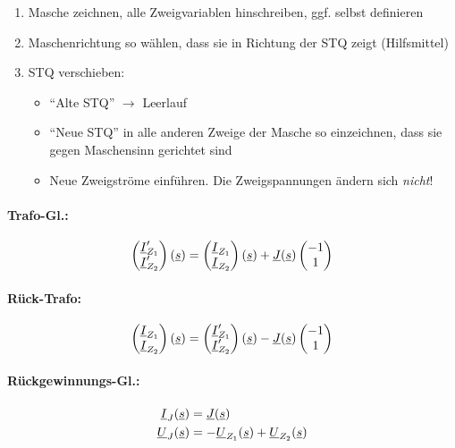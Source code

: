 \begin{minipage}{0.5\textwidth}
\begin{enumerate}[label=\arabic*.)]
  \item
    Masche zeichnen, alle Zweigvariablen hinschreiben, ggf. selbst definieren
  \item
    Maschenrichtung so wählen, dass sie in Richtung der STQ zeigt (Hilfsmittel)
  \item
    STQ verschieben:
    \begin{itemize}
      \item "`Alte STQ"' $\to$ Leerlauf
      \item "`Neue STQ"' in alle anderen Zweige der Masche so einzeichnen,
        dass sie gegen Maschensinn gerichtet sind
      \item Neue Zweigströme einführen.
        Die Zweigspannungen ändern sich \emph{nicht}!
    \end{itemize}
\end{enumerate}
\end{minipage}

\paragraph{Trafo-Gl.:}
\[\begin{pmatrix}
    \underline{I}_{Z_1}' \\
    \underline{I}_{Z_2}'
  \end{pmatrix}(\underline{s})
  = \begin{pmatrix}
      \underline{I}_{Z_1} \\
      \underline{I}_{Z_2}
    \end{pmatrix}(\underline{s})
    +\underline{J}(\underline{s})
    \begin{pmatrix}-1\\1\end{pmatrix}
\]

\paragraph{Rück-Trafo:}
\[\begin{pmatrix}
    \underline{I}_{Z_1} \\
    \underline{I}_{Z_2}
  \end{pmatrix}(\underline{s})
  = \begin{pmatrix}
      \underline{I}_{Z_1}' \\
      \underline{I}_{Z_2}'
    \end{pmatrix}(\underline{s})
    -\underline{J}(\underline{s})
    \begin{pmatrix}-1\\1\end{pmatrix}\]

\paragraph{Rückgewinnungs-Gl.:}
\[\begin{aligned}
  \underline{I}_J(\underline{s})  &= \underline{J}(\underline{s}) \\
  \underline{U}_J(\underline{s})  &= -\underline{U}_{Z_1}(\underline{s}) + \underline{U}_{Z_2}(\underline{s})
\end{aligned}\]
